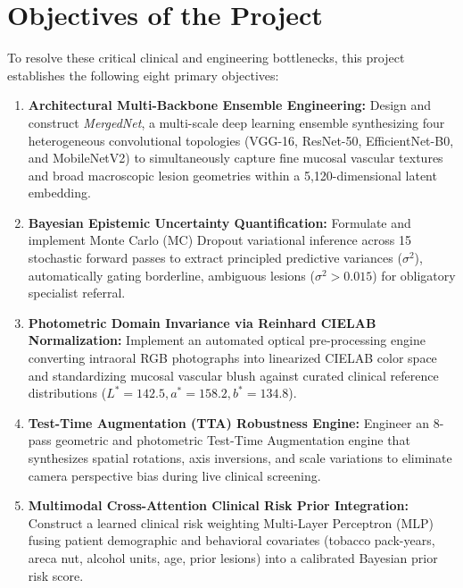 \documentclass[12pt,a4paper,oneside]{report}
\begin{document}
\section{Objectives of the Project}
\label{sec:objectives}

To resolve these critical clinical and engineering bottlenecks, this project establishes the following eight primary objectives:

\begin{enumerate}[label=\textbf{O\arabic*:}]
    \item \textbf{Architectural Multi-Backbone Ensemble Engineering:} Design and construct \textit{MergedNet}, a multi-scale deep learning ensemble synthesizing four heterogeneous convolutional topologies (VGG-16, ResNet-50, EfficientNet-B0, and MobileNetV2) to simultaneously capture fine mucosal vascular textures and broad macroscopic lesion geometries within a 5,120-dimensional latent embedding.
    
    \item \textbf{Bayesian Epistemic Uncertainty Quantification:} Formulate and implement Monte Carlo (MC) Dropout variational inference across 15 stochastic forward passes to extract principled predictive variances ($\sigma^2$), automatically gating borderline, ambiguous lesions ($\sigma^2 > 0.015$) for obligatory specialist referral.
    
    \item \textbf{Photometric Domain Invariance via Reinhard CIELAB Normalization:} Implement an automated optical pre-processing engine converting intraoral RGB photographs into linearized CIELAB color space and standardizing mucosal vascular blush against curated clinical reference distributions ($L^*=142.5, a^*=158.2, b^*=134.8$).
    
    \item \textbf{Test-Time Augmentation (TTA) Robustness Engine:} Engineer an 8-pass geometric and photometric Test-Time Augmentation engine that synthesizes spatial rotations, axis inversions, and scale variations to eliminate camera perspective bias during live clinical screening.
    
    \item \textbf{Multimodal Cross-Attention Clinical Risk Prior Integration:} Construct a learned clinical risk weighting Multi-Layer Perceptron (MLP) fusing patient demographic and behavioral covariates (tobacco pack-years, areca nut, alcohol units, age, prior lesions) into a calibrated Bayesian prior risk score.
    

\end{enumerate}
\end{document}
